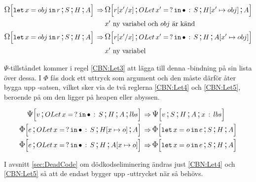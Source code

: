 \documentclass[../Optimise]{subfiles}
\begin{document}
\begin{align}
\label{CBN:Let1} \CBNOMEGA SHA{\eLet x{obj}r} \rulesep & \CBNOMEGA {\cOLet{x'}S}{\heap{x'}{obj}}A{\subst r{x'}x}\\
   & x'\mbox{ ny variabel och } obj \text{ är känd}\nonumber \\
\label{CBN:Let2} \CBNOMEGA SHA{\eLet x{obj}r} \rulesep & \CBNOMEGA{\cOLet{x'}S}H{\abyss{x'}{obj}}{\subst r{x'}x}\\
   & x'\mbox{ ny variabel} \nonumber 
\end{align}

$\Psi$-tillståndet kommer i regel \eqref{CBN:Let3} att lägga till denna -bindning
på sin lista över dessa.
 I $\Phi$ fås dock ett uttryck som argument och den måste därför 
åter bygga upp -satsen, vilket sker via de två reglerna \eqref{CBN:Let4} och 
\eqref{CBN:Let5}, beroende på om den ligger på heapen eller abyssen.

\begin{align}
\label{CBN:Let3} \CBNPSI{\cOLet xS}H A{lbs}v \rulesep & \CBNPSI SHA{x\,:\, lbs}v \\
\label{CBN:Let4} \CBNIRR{\cOLet xS}{\heap xo}Ae \rulesep & \CBNIRR SHA{\eLet xoe} \\
\label{CBN:Let5} \CBNIRR{\cOLet xS}H{\abyss xo}e \rulesep & \CBNIRR SHA{\eLet xoe}
\end{align}


I avsnitt \ref{sec:DeadCode} om dödkodseliminering ändras just \eqref{CBN:Let4} 
och \eqref{CBN:Let5} så att de endast bygger upp -uttrycket när så behövs.


\end{document}

